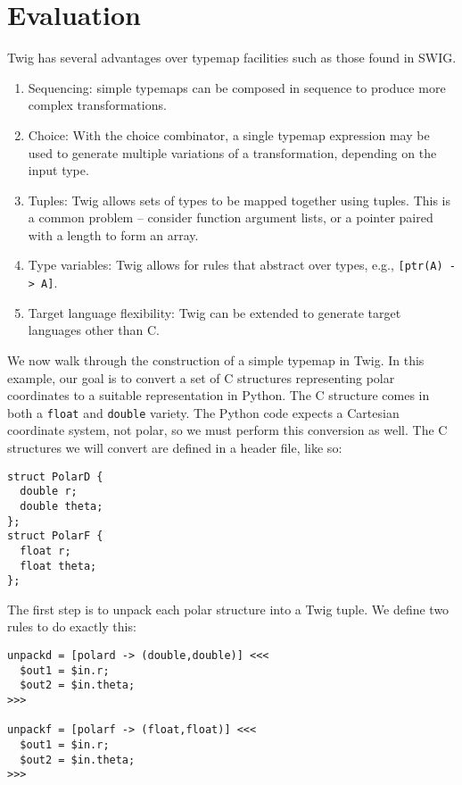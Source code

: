 
\section{Evaluation}

Twig has several advantages over typemap facilities such as those
found in SWIG.

\begin{enumerate}

\item Sequencing: simple typemaps can be composed in sequence to
produce more complex transformations.

\item Choice: With the choice combinator, a single typemap
expression may be used to generate multiple variations of a
transformation, depending on the input type.

\item Tuples: Twig allows sets of types to be mapped together
using tuples. This is a common problem -- consider function
argument lists, or a pointer paired with a length to form an
array.

\item Type variables: Twig allows for rules that abstract over
types, e.g., \texttt{[ptr(A) -> A]}.

\item Target language flexibility: Twig can be extended to
generate target languages other than C.

\end{enumerate}

We now walk through the construction of a simple typemap in Twig.
In this example, our goal is to convert a set of C structures
representing polar coordinates to a suitable representation in
Python. The C structure comes in both a \texttt{float} and
\texttt{double} variety. The Python code expects a Cartesian
coordinate system, not polar, so we must perform this conversion
as well. The C structures we will convert are defined in a header
file, like so:

\begin{verbatim}
struct PolarD {
  double r;
  double theta;
};
struct PolarF {
  float r;
  float theta;
};
\end{verbatim}

The first step is to unpack each polar structure into a Twig
tuple. We define two rules to do exactly this:

\begin{verbatim}
unpackd = [polard -> (double,double)] <<<
  $out1 = $in.r;
  $out2 = $in.theta;
>>>

unpackf = [polarf -> (float,float)] <<<
  $out1 = $in.r;
  $out2 = $in.theta;
>>>
\end{verbatim}

